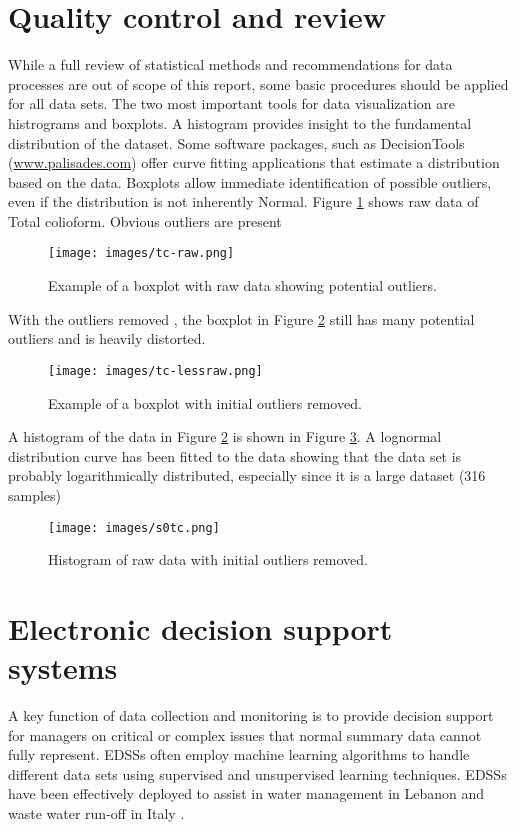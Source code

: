 \section{Quality control and review}

While a full review of statistical methods and recommendations for data processes are out of scope of this report, some basic procedures should be applied for all data sets. The two most important tools for data visualization are histrograms and boxplots.  A histogram provides insight to the fundamental distribution of the dataset. Some software packages, such as DecisionTools (\url{www.palisades.com}) offer curve fitting applications that estimate a distribution based on the data. Boxplots allow immediate identification of possible outliers, even if the distribution is not inherently Normal. Figure \ref{fig:rawtc} shows raw data of Total colioform. Obvious outliers are present

\begin{figure}[H]
\centering
\texttt{[image: images/tc-raw.png]} 
\caption{Example of a boxplot with raw data showing potential outliers.}
\label{fig:rawtc}
\end{figure}

With the outliers removed , the boxplot in Figure \ref{fig:lessrawtc} still has many potential outliers and is heavily distorted.

\begin{figure}[H]
\centering
\texttt{[image: images/tc-lessraw.png]} 
\caption{Example of a boxplot with initial outliers removed.}
\label{fig:lessrawtc}
\end{figure}

A histogram of the data in Figure \ref{fig:lessrawtc} is shown in Figure \ref{fig:histc}. A lognormal distribution curve has been fitted to the data showing that the data set is probably logarithmically distributed, especially since it is a large dataset (316 samples)

\begin{figure}[H]
\centering
\texttt{[image: images/s0tc.png]} 
\caption{Histogram of raw data with initial outliers removed.}
\label{fig:histc}
\end{figure}

\section{Electronic decision support systems}
A key function of data collection and monitoring is to provide decision support for managers on critical or complex issues that normal summary data cannot fully represent. EDSSs often employ machine learning algorithms to handle different data sets using supervised and unsupervised learning techniques. EDSSs have been effectively deployed to assist in water management in Lebanon \citep{Assaf2008}and waste water run-off in Italy \citep{Massei2014}.

